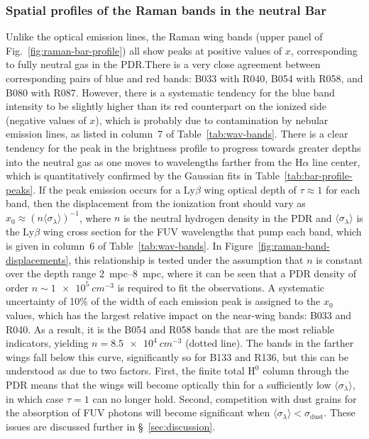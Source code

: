 \documentclass[useAMS, usenatbib, a4paper]{mnras}
\newcommand*\chem[1]{\ensuremath{\mathrm{#1}}}
\newcommand\ha{\ensuremath{\text{H}\alpha}}
\newcommand\lyb{\ensuremath{\text{Ly}\beta}}
\begin{document}
\subsubsection{Spatial profiles of the Raman bands in the neutral Bar}
\label{sec:spat-prof-raman}
Unlike the optical emission lines, the Raman wing bands (upper panel
of Fig.~\ref{fig:raman-bar-profile}) all show peaks at positive values
of \(x\), corresponding to fully neutral gas in the PDR.\@ There is a
very close agreement between corresponding pairs of blue and red
bands: B033 with R040, B054 with R058, and B080 with R087.  However,
there is a systematic tendency for the blue band intensity to be
slightly higher than its red counterpart on the ionized side (negative
values of \(x\)), which is probably due to contamination by nebular
emission lines, as listed in column~7 of
Table~\ref{tab:wav-bands}. There is a clear tendency for the peak in
the brightness profile to progress towards greater depths into the
neutral gas as one moves to wavelengths farther from the \ha{} line
center, which is quantitatively confirmed by the Gaussian fits in
Table~\ref{tab:bar-profile-peaks}.  If the peak emission occurs for a
\lyb{} wing optical depth of \(\tau \approx 1\) for each band, then the
displacement from the ionization front should vary as
\(x_0 \approx (n \langle \sigma_\lambda \rangle)^{-1}\), where \(n\) is the neutral hydrogen
density in the PDR and \(\langle \sigma_\lambda \rangle\) is the \lyb{} wing cross section
for the FUV wavelengths that pump each band, which is given in
column~6 of Table~\ref{tab:wav-bands}.  In
Figure~\ref{fig:raman-band-displacements}, this relationship is tested
under the assumption that \(n\) is constant over the depth range
\SIrange{2}{8}{mpc}, where it can be seen that a PDR density of order
\(n \sim \SI{1e5}{cm^{-3}}\) is required to fit the observations.  A
systematic uncertainty of 10\% of the width of each emission peak is
assigned to the \(x_0\) values, which has the largest relative impact
on the near-wing bands: B033 and R040.  As a result, it is the B054
and R058 bands that are the most reliable indicators, yielding
\(n = \SI{8.5e4}{cm^{-3}}\) (dotted line).  The bands in the farther
wings fall below this curve, significantly so for B133 and R136, but
this can be understood as due to two factors.  First, the finite total
\chem{H^0} column through the PDR means that the wings will become
optically thin for a sufficiently low
\(\langle \sigma_\lambda \rangle\), in which case \(\tau = 1\) can no longer hold.  Second,
competition with dust grains for the absorption of FUV photons will
become significant when
\(\langle \sigma_\lambda \rangle < \sigma_{\text{dust}}\).  These issues are discussed further in
\S~\ref{sec:discussion}.
\end{document}
